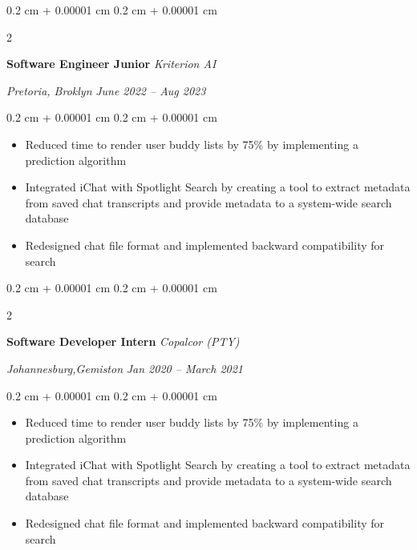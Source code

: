 \documentclass[10pt, letterpaper]{article}
\newenvironment{highlights}{
    \begin{itemize}[
        topsep=0.10 cm,
        parsep=0.10 cm,
        partopsep=0pt,
        itemsep=0pt,
        leftmargin=0.4 cm + 10pt
    ]
}{
    \end{itemize}
} %
\newenvironment{onecolentry}{
    \begin{adjustwidth}{
        0.2 cm + 0.00001 cm
    }{
        0.2 cm + 0.00001 cm
    }
}{
    \end{adjustwidth}
} %
\newenvironment{twocolentry}[2][]{
    \onecolentry
    \def\secondColumn{#2}
    \setcolumnwidth{\fill, 4.5 cm}
    \begin{paracol}{2}
}{
    \switchcolumn \raggedleft \secondColumn
    \end{paracol}
    \endonecolentry
} %
\begin{document}
        \vspace{0.2 cm}

        \begin{twocolentry}{
        \textit{Pretoria, Broklyn}    
        \newline
        \textit{June 2022 – Aug 2023}}
            \textbf{Software Engineer Junior}
            \newline
            \textit{Kriterion AI}
        \end{twocolentry}

        \vspace{0.20 cm}
        \begin{onecolentry}
            \begin{highlights}
                \item Reduced time to render user buddy lists by 75\% by implementing a prediction algorithm
                \item Integrated iChat with Spotlight Search by creating a tool to extract metadata from saved chat transcripts and provide metadata to a system-wide search database
                \item Redesigned chat file format and implemented backward compatibility for search
            \end{highlights}
        \end{onecolentry}

        \vspace{0.2 cm}

        \begin{twocolentry}{
        \textit{Johannesburg,Gemiston}    
        \newline
        \textit{Jan 2020 – March 2021}}
            \textbf{Software Developer Intern}
            \newline
            \textit{Copalcor (PTY)}
        \end{twocolentry}

        \vspace{0.20 cm}
        \begin{onecolentry}
            \begin{highlights}
                \item Reduced time to render user buddy lists by 75\% by implementing a prediction algorithm
                \item Integrated iChat with Spotlight Search by creating a tool to extract metadata from saved chat transcripts and provide metadata to a system-wide search database
                \item Redesigned chat file format and implemented backward compatibility for search
            \end{highlights}
        \end{onecolentry}
\end{document}
